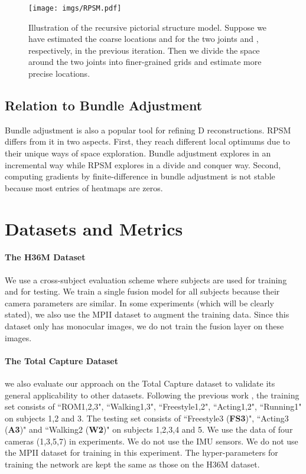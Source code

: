 \documentclass[10pt,twocolumn,letterpaper]{article}
\begin{document}
\begin{figure}
	\centering
	\texttt{[image: imgs/RPSM.pdf]}
	\caption{Illustration of the recursive pictorial structure model. Suppose we have estimated the coarse locations  and  for the two joints  and , respectively, in the previous iteration. Then we divide the space around the two joints into finer-grained grids and estimate more precise locations.}
	\label{fig:recursive}
\end{figure}

\subsection{Relation to Bundle Adjustment \cite{triggs1999bundle}}
Bundle adjustment \cite{triggs1999bundle} is also a popular tool for refining D reconstructions. RPSM differs from it in two aspects. First, they reach different local optimums due to their unique ways of space exploration. Bundle adjustment explores in an incremental way while RPSM explores in a divide and conquer way. Second, computing gradients by finite-difference in bundle adjustment is not stable because most entries of heatmaps are zeros.


\section{Datasets and Metrics}
\paragraph{The H36M Dataset \cite{ionescu2014human3}} We use a cross-subject evaluation scheme where subjects  are used for training and  for testing. We train a single fusion model for all subjects because their camera parameters are similar. In some experiments (which will be clearly stated), we also use the MPII dataset \cite{andriluka20142D} to augment the training data. Since this dataset only has monocular images, we do not train the fusion layer on these images. 

\paragraph{The Total Capture Dataset \cite{trumble2017total}} we also evaluate our approach on the Total Capture dataset to validate its general applicability to other datasets. Following the previous work \cite{trumble2017total}, the training set consists of ``ROM1,2,3", ``Walking1,3", ``Freestyle1,2", ``Acting1,2", ``Running1" on subjects 1,2 and 3. The testing set consists of ``Freestyle3 (\textbf{FS3})", ``Acting3 (\textbf{A3})" and ``Walking2 (\textbf{W2})" on subjects 1,2,3,4 and 5. We use the data of four cameras (1,3,5,7) in experiments.  We do not use the IMU sensors. We do not use the MPII dataset for training in this experiment. The hyper-parameters for training the network are kept the same as those on the H36M dataset.
\end{document}

